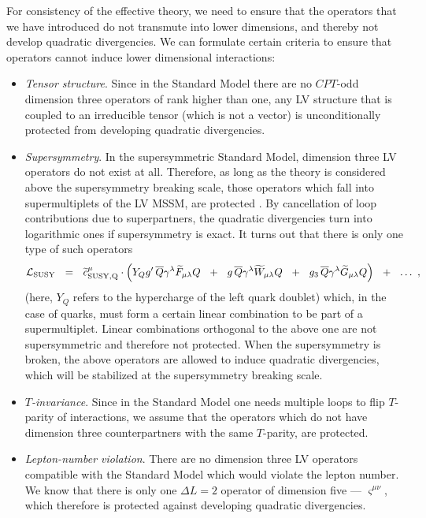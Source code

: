 \documentclass[12pt,preprintnumbers,nofootinbib]{revtex4}
\newcommand{\wt}{\widetilde}
\newcommand{\ov}{\overline}
\begin{document}
	For consistency of the effective theory, we need to ensure that the operators that we have
	introduced do not transmute into lower dimensions, and thereby not develop quadratic
	divergencies. 
	We can formulate certain criteria to ensure that operators cannot induce lower dimensional
	interactions:
\begin{itemize}
\item	{\it Tensor structure}. Since in the Standard Model there are no $CPT$-odd  
	dimension three operators of rank higher than one, any LV structure that is coupled
	to an irreducible tensor (which is not a vector) is unconditionally protected from
	developing quadratic divergencies.
\item	{\it Supersymmetry}. In the supersymmetric Standard Model, dimension three LV operators
	do not exist at all. 
	Therefore, as long as the theory is considered above the supersymmetry breaking scale, 
	those operators which fall into supermultiplets of the LV MSSM, are protected
\cite{Bolokhov:2005cj}.
	By cancellation of loop contributions due to superpartners, the quadratic divergencies
	turn into logarithmic ones if supersymmetry is exact. 
	It turns out that there is only one type of such operators
\begin{equation}
\label{SUSY_prot}
	\mathcal{L}_{\rm SUSY} ~~=~~
	\wt{c}_{\rm SUSY,Q}^\mu \cdot 
	\left( Y_Q g'\, \ov{Q} \gamma^\lambda \wt{F}_{\mu\lambda} Q   ~~+~~
	g\,  \ov{Q} \gamma^\lambda \wt{W}_{\mu\lambda} Q   ~~+~~
	g_3\, \ov{Q} \gamma^\lambda \wt{G}_{\mu\lambda} Q 
	\right)  ~~+~~
	\ldots~,
\end{equation}	
	(here, $ Y_Q $ refers to the hypercharge of the left quark doublet)
	which, in the case of quarks, must form a certain linear combination to be part of 
	a supermultiplet.
	Linear combinations orthogonal to the above one are not supersymmetric and therefore
	not protected.	
	When the supersymmetry is broken, the above operators are allowed to induce 
	quadratic divergencies, which will be stabilized at the supersymmetry breaking scale. 

\item	{\it $T$-invariance}. Since in the Standard Model one needs multiple loops to flip
	$ T $-parity of interactions, we assume that the operators which do not have dimension
	three counterpartners with the same $ T $-parity, are protected.

\item	{\it Lepton-number violation}. There are no dimension three LV operators compatible with
	the Standard Model which would violate the lepton number. 
	We know that there is only one $ \Delta L = 2 $ operator of dimension five --- 
	$ \varsigma^{\mu\nu} $, which therefore is protected against developing quadratic divergencies.
\end{itemize}
	
\end{document}
